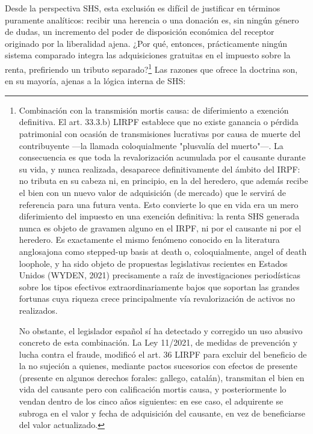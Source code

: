\documentclass[10pt,a4paper]{article}
\begin{document}
Desde la perspectiva SHS, esta exclusión es difícil de justificar en términos puramente analíticos: recibir una herencia o una donación es, sin ningún género de dudas, un incremento del poder de disposición económica del receptor originado por la liberalidad ajena. ¿Por qué, entonces, prácticamente ningún sistema comparado integra las adquisiciones gratuitas en el impuesto sobre la renta, prefiriendo un tributo separado?\footnote{%
    Combinación con la transmisión mortis causa: de diferimiento a exención definitiva. El art. 33.3.b) LIRPF establece que no existe ganancia o pérdida patrimonial con ocasión de transmisiones lucrativas por causa de muerte del contribuyente —la llamada coloquialmente "plusvalía del muerto"—. La consecuencia es que toda la revalorización acumulada por el causante durante su vida, y nunca realizada, desaparece definitivamente del ámbito del IRPF: no tributa en su cabeza ni, en principio, en la del heredero, que además recibe el bien con un nuevo valor de adquisición (de mercado) que le servirá de referencia para una futura venta. Esto convierte lo que en vida era un mero diferimiento del impuesto en una exención definitiva: la renta SHS generada nunca es objeto de gravamen alguno en el IRPF, ni por el causante ni por el heredero. Es exactamente el mismo fenómeno conocido en la literatura anglosajona como stepped-up basis at death o, coloquialmente, angel of death loophole, y ha sido objeto de propuestas legislativas recientes en Estados Unidos (WYDEN, 2021) precisamente a raíz de investigaciones periodísticas sobre los tipos efectivos extraordinariamente bajos que soportan las grandes fortunas cuya riqueza crece principalmente vía revalorización de activos no realizados.

No obstante, el legislador español sí ha detectado y corregido un uso abusivo concreto de esta combinación. La Ley 11/2021, de medidas de prevención y lucha contra el fraude, modificó el art. $36$ LIRPF para excluir del beneficio de la no sujeción a quienes, mediante pactos sucesorios con efectos de presente (presente en algunos derechos forales: gallego, catalán), transmitan el bien en vida del causante pero con calificación mortis causa, y posteriormente lo vendan dentro de los cinco años siguientes: en ese caso, el adquirente se subroga en el valor y fecha de adquisición del causante, en vez de beneficiarse del valor actualizado.
} Las razones que ofrece la doctrina son, en su mayoría, ajenas a la lógica interna de SHS:
\end{document}
